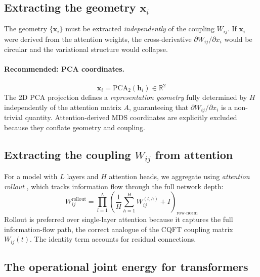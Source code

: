 \documentclass[12pt,a4paper]{article}
\theoremstyle{plain}
\theoremstyle{definition}
\begin{document}
\subsection{Extracting the geometry $\mathbf{x}_i$}
\label{subsec:geom_extract}

The geometry $\{\mathbf{x}_i\}$ must be extracted \emph{independently}
of the coupling $W_{ij}$. If $\mathbf{x}_i$ were derived from the
attention weights, the cross-derivative $\partial W_{ij}/\partial x_i$
would be circular and the variational structure would collapse.

\paragraph{Recommended: PCA coordinates.}
\begin{equation}
\label{eq:geom_pca}
\mathbf{x}_i = \text{PCA}_2(\mathbf{h}_i) \in \mathbb{R}^2
\end{equation}
The 2D PCA projection defines a \emph{representation geometry} fully
determined by $H$ independently of the attention matrix $A$, guaranteeing
that $\partial W_{ij}/\partial x_i$ is a non-trivial quantity.
Attention-derived MDS coordinates are explicitly excluded because they
conflate geometry and coupling.

\subsection{Extracting the coupling $W_{ij}$ from attention}
\label{subsec:coupling_extract}

For a model with $L$ layers and $H$ attention heads, we aggregate using
\emph{attention rollout} \citep{abnar2020quantifying}, which tracks
information flow through the full network depth:
\begin{equation}
\label{eq:rollout}
W_{ij}^{\text{rollout}} = \prod_{l=1}^{L}
  \left(\frac{1}{H}\sum_{h=1}^{H} W_{ij}^{(l,h)} + I\right)_{\!\text{row-norm}}
\end{equation}
Rollout is preferred over single-layer attention because it captures the
full information-flow path, the correct analogue of the CQFT coupling
matrix $W_{ij}(t)$. The identity term accounts for residual connections.

\subsection{The operational joint energy for transformers}
\label{subsec:lagrangian_transformer}
\end{document}
